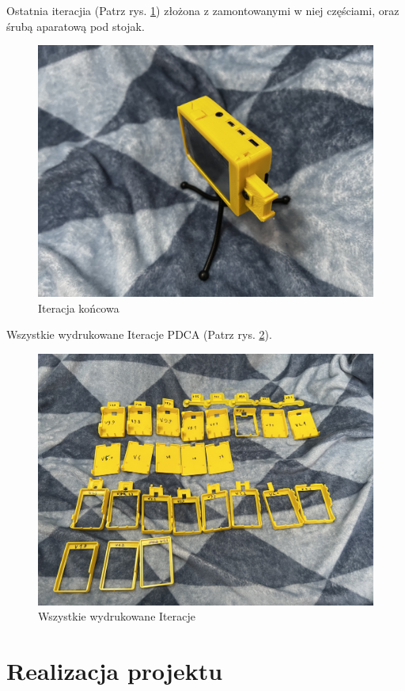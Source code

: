 \documentclass[a4paper,12pt,reqno]{article}
\begin{document}
\newpage
Ostatnia iteracjia (Patrz rys. \ref{PDCA_END}) złożona z zamontowanymi w niej częściami, oraz śrubą aparatową pod stojak.
\begin{figure}[H]%
\centering
\includegraphics[width=0.8\columnwidth]{imgs/print_last_assembled.jpg}
\caption{Iteracja końcowa \label{PDCA_END}}
\quad
\end{figure}

Wszystkie wydrukowane Iteracje PDCA (Patrz rys. \ref{PDCA_ALL}).

\begin{figure}[H]%
\centering
\includegraphics[width=0.8\columnwidth]{imgs/print_all.jpg}
\caption{Wszystkie wydrukowane Iteracje \label{PDCA_ALL}}
\quad
\end{figure}

\section{Realizacja projektu} \label{section:realizacja}
\end{document}
